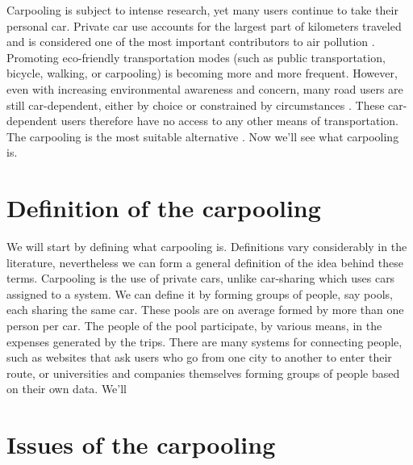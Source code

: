 \documentclass[12pt, a4paper, twoside]{memoir}
\newcommand{\newpar}{\vskip 0.2in \noindent}
\begin{document}
	Carpooling is subject to intense research, yet many users continue to take their personal car. Private car use accounts for the largest part of kilometers traveled and is considered one of the most important contributors to air pollution \cite{laucontributions2008}. Promoting eco-friendly transportation modes (such as public transportation, bicycle, walking, or carpooling) is becoming more and more frequent. However, even with increasing environmental awareness and concern, many road users are still car-dependent, either by choice or constrained by circumstances \cite{stradeterminants2007}. These car-dependent users therefore have no access to any other means of transportation. The carpooling is the most suitable alternative \cite{delhommecomparing2016}.
	\newpar 
	Now we'll see what carpooling is.
	
	\section{Definition of the carpooling}\label{sec:The kinds of carpooling}
	We will start by defining what carpooling is. Definitions vary considerably in the literature, nevertheless we can form a general definition of the idea behind these terms. Carpooling is the use of private cars, unlike car-sharing which uses cars assigned to a system. We can define it by forming groups of people, say pools, each sharing the same car. These pools are on average formed by more than one person per car. The people of the pool participate, by various means, in the expenses generated by the trips.\newline
	There are many systems for connecting people, such as websites that ask users who go from one city to another to enter their route, or universities and companies themselves forming groups of people based on their own data.
	\newpar
	We'll 
	
	\section*{Issues of the carpooling}
	
\end{document}
